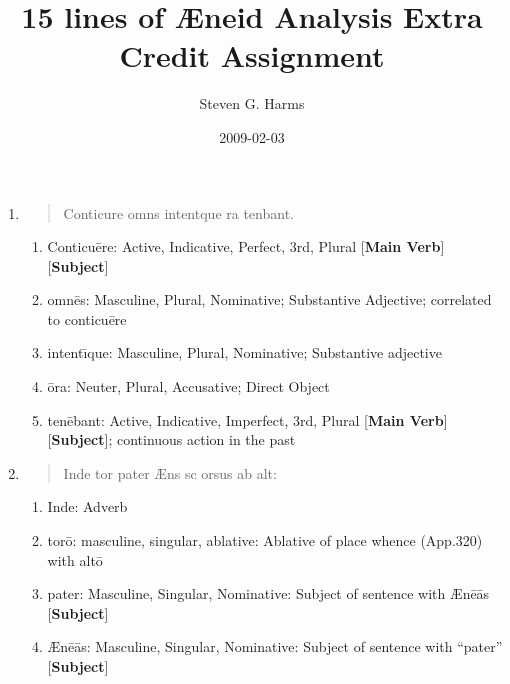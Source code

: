 \documentclass[]{article}
\title{15 lines of {\AE}neid Analysis Extra Credit Assignment}
\author{Steven G. Harms }
\date{2009-02-03}
\newcommand{\latify}[1]{
        \Large
        \begin{verse}
          \begin{metrica}
          {#1}\\
          \end{metrica}
        \end{verse}
        \normalsize
}
\begin{document}

\ifpdf
{}
\else
{}
\fi

\maketitle

\begin{enumerate}
	
\item \latify{Conticu{}re omn{\macron {e}}s intent{\macron {\i}}que {\macron {o}}ra ten{\macron {e}}bant.}

\begin{enumerate}

	\item Conticu\=ere:  Active, Indicative, Perfect, 3rd, Plural [\textbf{Main Verb}]  [\textbf{Subject}]

	\item omn\=es:  Masculine, Plural, Nominative; Substantive Adjective; correlated to conticu\={e}re

	\item intent\={\i}que:  Masculine, Plural, Nominative; Substantive adjective 

	\item \=ora:  Neuter, Plural, Accusative; Direct Object

	\item ten\=ebant:  Active, Indicative, Imperfect, 3rd, Plural [\textbf{Main Verb}] [\textbf{Subject}]; continuous action in the past 

\end{enumerate}


\item \latify{Inde tor{} pater {\AE}n{}{\macron {a}}s s{\macron {\i}}c orsus ab alt{\macron {o}}:}
\begin{enumerate}                                          
	
	\item Inde:  Adverb
	
	\item tor\=o: masculine, singular, ablative:  Ablative of place whence (App.320) with alt\={o}
	
	\item pater: Masculine, Singular, Nominative:  Subject of sentence with {\AE}n\={e}\={a}s [\textbf{Subject}]
	
	\item {\AE}n\=e\=as: Masculine, Singular, Nominative:  Subject of sentence with ``pater''  [\textbf{Subject}]
	

\end{enumerate}
\end{enumerate}
\end{document}
